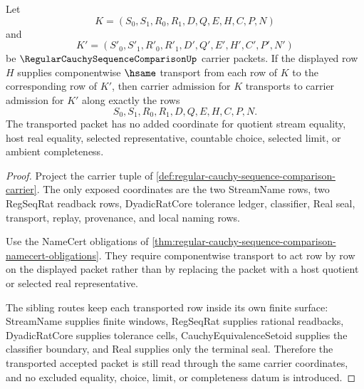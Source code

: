 \begin{theorem}
\label{thm:regular-cauchy-sequence-comparison-carrier-transport}
Let
$$
K=(S_0,S_1,R_0,R_1,D,Q,E,H,C,P,N)
$$
and
$$
K'=(S'_0,S'_1,R'_0,R'_1,D',Q',E',H',C',P',N')
$$
be $\RegularCauchySequenceComparisonUp$ carrier packets. If the displayed row $H$ supplies componentwise $\hsame$ transport from each row of $K$ to the corresponding row of $K'$, then carrier admission for $K$ transports to carrier admission for $K'$ along exactly the rows
$$
S_0,S_1,R_0,R_1,D,Q,E,H,C,P,N.
$$
The transported packet has no added coordinate for quotient stream equality, host real equality, selected representative, countable choice, selected limit, or ambient completeness.
\end{theorem}
\begin{proof}
Project the carrier tuple of \autoref{def:regular-cauchy-sequence-comparison-carrier}. The only exposed coordinates are the two StreamName rows, two RegSeqRat readback rows, DyadicRatCore tolerance ledger, classifier, Real seal, transport, replay, provenance, and local naming rows.

Use the NameCert obligations of \autoref{thm:regular-cauchy-sequence-comparison-namecert-obligations}. They require componentwise transport to act row by row on the displayed packet rather than by replacing the packet with a host quotient or selected real representative.

The sibling routes keep each transported row inside its own finite surface: StreamName supplies finite windows, RegSeqRat supplies rational readbacks, DyadicRatCore supplies tolerance cells, CauchyEquivalenceSetoid supplies the classifier boundary, and Real supplies only the terminal seal. Therefore the transported accepted packet is still read through the same carrier coordinates, and no excluded equality, choice, limit, or completeness datum is introduced.
\end{proof}

